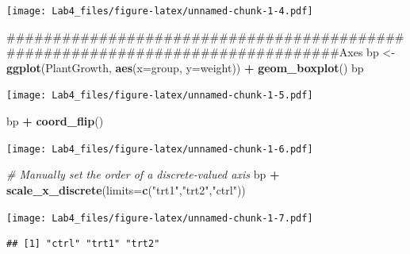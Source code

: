 \documentclass[]{article}
\newenvironment{Shaded}{\begin{snugshade}}{\end{snugshade}}
\newcommand{\KeywordTok}[1]{\textcolor[rgb]{0.13,0.29,0.53}{\textbf{#1}}}
\newcommand{\DataTypeTok}[1]{\textcolor[rgb]{0.13,0.29,0.53}{#1}}
\newcommand{\StringTok}[1]{\textcolor[rgb]{0.31,0.60,0.02}{#1}}
\newcommand{\CommentTok}[1]{\textcolor[rgb]{0.56,0.35,0.01}{\textit{#1}}}
\newcommand{\OperatorTok}[1]{\textcolor[rgb]{0.81,0.36,0.00}{\textbf{#1}}}
\newcommand{\NormalTok}[1]{#1}
\begin{document}
\texttt{[image: Lab4\_files/figure-latex/unnamed-chunk-1-4.pdf]}

\begin{Shaded}
\begin{Highlighting}[]
\NormalTok{###############################################################################Axes }
\NormalTok{bp <-}\StringTok{ }\KeywordTok{ggplot}\NormalTok{(PlantGrowth, }\KeywordTok{aes}\NormalTok{(}\DataTypeTok{x=}\NormalTok{group, }\DataTypeTok{y=}\NormalTok{weight)) }\OperatorTok{+}
\StringTok{    }\KeywordTok{geom_boxplot}\NormalTok{()}
\NormalTok{bp}
\end{Highlighting}
\end{Shaded}

\texttt{[image: Lab4\_files/figure-latex/unnamed-chunk-1-5.pdf]}

\begin{Shaded}
\begin{Highlighting}[]
\NormalTok{bp }\OperatorTok{+}\StringTok{ }\KeywordTok{coord_flip}\NormalTok{()}
\end{Highlighting}
\end{Shaded}

\texttt{[image: Lab4\_files/figure-latex/unnamed-chunk-1-6.pdf]}

\begin{Shaded}
\begin{Highlighting}[]
\CommentTok{# Manually set the order of a discrete-valued axis}
\NormalTok{bp }\OperatorTok{+}\StringTok{ }\KeywordTok{scale_x_discrete}\NormalTok{(}\DataTypeTok{limits=}\KeywordTok{c}\NormalTok{(}\StringTok{"trt1"}\NormalTok{,}\StringTok{"trt2"}\NormalTok{,}\StringTok{"ctrl"}\NormalTok{))}
\end{Highlighting}
\end{Shaded}

\texttt{[image: Lab4\_files/figure-latex/unnamed-chunk-1-7.pdf]}

\begin{Shaded}
\end{Shaded}

\begin{verbatim}
## [1] "ctrl" "trt1" "trt2"
\end{verbatim}
\end{document}
